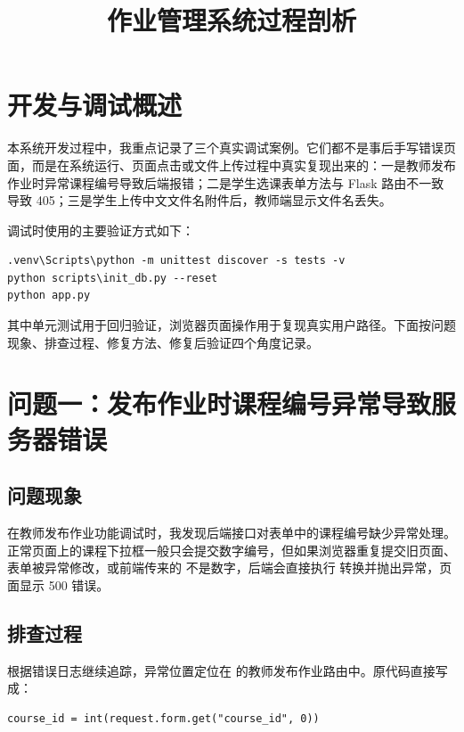 \documentclass[UTF8,12pt]{ctexart}
\title{\textbf{作业管理系统过程剖析}}
\author{}
\date{}
\begin{document}
\maketitle

\section{开发与调试概述}

本系统开发过程中，我重点记录了三个真实调试案例。它们都不是事后手写错误页面，而是在系统运行、页面点击或文件上传过程中真实复现出来的：一是教师发布作业时异常课程编号导致后端报错；二是学生选课表单方法与 Flask 路由不一致导致 405；三是学生上传中文文件名附件后，教师端显示文件名丢失。

调试时使用的主要验证方式如下：

\begin{verbatim}
.venv\Scripts\python -m unittest discover -s tests -v
python scripts\init_db.py --reset
python app.py
\end{verbatim}

其中单元测试用于回归验证，浏览器页面操作用于复现真实用户路径。下面按问题现象、排查过程、修复方法、修复后验证四个角度记录。

\newpage

\section{问题一：发布作业时课程编号异常导致服务器错误}

\subsection{问题现象}

在教师发布作业功能调试时，我发现后端接口对表单中的课程编号缺少异常处理。正常页面上的课程下拉框一般只会提交数字编号，但如果浏览器重复提交旧页面、表单被异常修改，或前端传来的  不是数字，后端会直接执行  转换并抛出异常，页面显示 500 错误。


\subsection{排查过程}

根据错误日志继续追踪，异常位置定位在  的教师发布作业路由中。原代码直接写成：

\begin{verbatim}
course_id = int(request.form.get("course_id", 0))
\end{verbatim}
\end{document}
